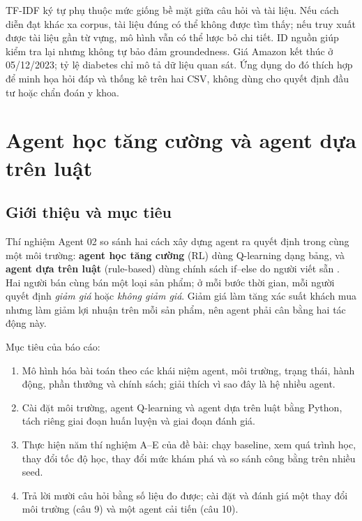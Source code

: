 \documentclass[12pt,a4paper]{report}
\begin{document}
TF-IDF ký tự phụ thuộc mức giống bề mặt giữa câu hỏi và tài liệu. Nếu cách diễn đạt khác xa
corpus, tài liệu đúng có thể không được tìm thấy; nếu truy xuất được tài liệu gần từ vựng,
mô hình vẫn có thể lược bỏ chi tiết. ID nguồn giúp kiểm tra lại nhưng không tự bảo đảm
groundedness. Giá Amazon kết thúc ở 05/12/2023; tỷ lệ diabetes chỉ mô tả dữ liệu quan sát.
Ứng dụng do đó thích hợp để minh họa hỏi đáp và thống kê trên hai CSV, không dùng cho quyết định
đầu tư hoặc chẩn đoán y khoa.

\clearpage


\clearpage
\chapter{Agent học tăng cường và agent dựa trên luật}
\label{ch:agent02}

\section{Giới thiệu và mục tiêu}
\label{chap:intro}

Thí nghiệm Agent 02 so sánh hai cách xây dựng agent ra quyết định trong cùng một
môi trường: \textbf{agent học tăng cường} (RL) dùng Q-learning dạng bảng, và
\textbf{agent dựa trên luật} (rule-based) dùng chính sách if--else do người viết sẵn
\cite{assignment,complementary}. Hai người bán cùng bán một loại sản phẩm; ở mỗi bước
thời gian, mỗi người quyết định \emph{giảm giá} hoặc \emph{không giảm giá}. Giảm giá
làm tăng xác suất khách mua nhưng làm giảm lợi nhuận trên mỗi sản phẩm, nên agent
phải cân bằng hai tác động này.

Mục tiêu của báo cáo:
\begin{enumerate}
\item Mô hình hóa bài toán theo các khái niệm agent, môi trường, trạng thái, hành
  động, phần thưởng và chính sách; giải thích vì sao đây là hệ nhiều agent.
\item Cài đặt môi trường, agent Q-learning và agent dựa trên luật bằng Python, tách
  riêng giai đoạn huấn luyện và giai đoạn đánh giá.
\item Thực hiện năm thí nghiệm A--E của đề bài: chạy baseline, xem quá trình học,
  thay đổi tốc độ học, thay đổi mức khám phá và so sánh công bằng trên nhiều seed.
\item Trả lời mười câu hỏi bằng số liệu đo được; cài đặt và đánh giá một thay đổi
  môi trường (câu 9) và một agent cải tiến (câu 10).
\end{enumerate}
\end{document}
